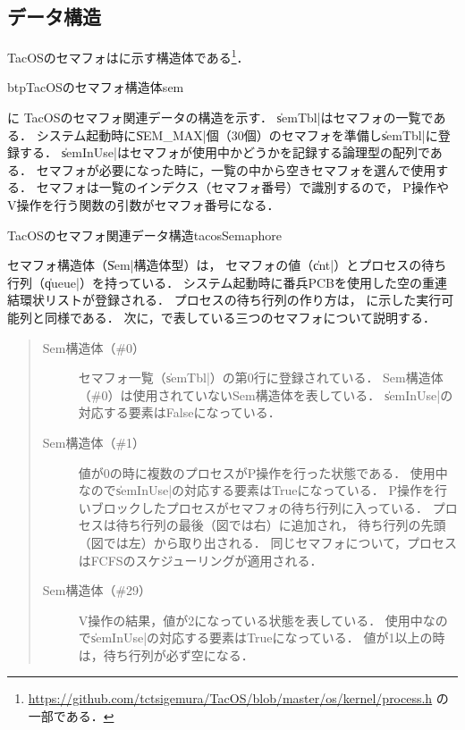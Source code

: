 \subsection{データ構造}
TacOSのセマフォはに示す構造体である\footnote{
\url{https://github.com/tctsigemura/TacOS/blob/master/os/kernel/process.h}
の一部である．}．

\begin{myfig}{btp}{TacOSのセマフォ構造体}{sem}

\end{myfig}

に
TacOSのセマフォ関連データの構造を示す．
\|semTbl|はセマフォの一覧である．
システム起動時に\|SEM_MAX|個（30個）のセマフォを準備し\|semTbl|に登録する．
\|semInUse|はセマフォが使用中かどうかを記録する論理型の配列である．
セマフォが必要になった時に，一覧の中から空きセマフォを選んで使用する．
セマフォは一覧のインデクス（セマフォ番号）で識別するので，
P操作やV操作を行う関数の引数がセマフォ番号になる．

{TacOSのセマフォ関連データ構造}{tacosSemaphore}

セマフォ構造体（\|Sem|構造体型）は，
セマフォの値（\|cnt|）とプロセスの待ち行列（\|queue|）を持っている．
システム起動時に番兵PCBを使用した空の重連結環状リストが登録される．
プロセスの待ち行列の作り方は，
に示した実行可能列と同様である．
次に，で表している三つのセマフォについて説明する．

\begin{quote}
\begin{description}
\item [Sem構造体（\#0）]
セマフォ一覧（\|semTbl|）の第0行に登録されている．
Sem構造体（\#0）は使用されていないSem構造体を表している．
\|semInUse|の対応する要素はFalseになっている．

\item [Sem構造体（\#1）]
値が0の時に複数のプロセスがP操作を行った状態である．
使用中なので\|semInUse|の対応する要素はTrueになっている．
P操作を行いブロックしたプロセスがセマフォの待ち行列に入っている．
プロセスは待ち行列の最後（図では右）に追加され，
待ち行列の先頭（図では左）から取り出される．
同じセマフォについて，プロセスはFCFSのスケジューリングが適用される．

\item [Sem構造体（\#29）]
V操作の結果，値が2になっている状態を表している．
使用中なので\|semInUse|の対応する要素はTrueになっている．
値が1以上の時は，待ち行列が必ず空になる．
\end{description}
\end{quote}


